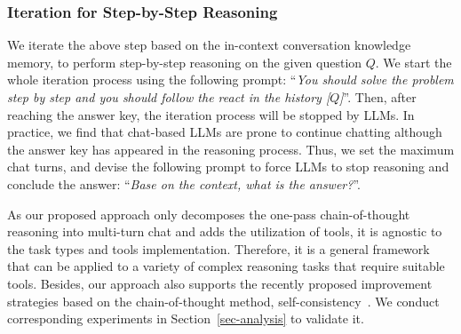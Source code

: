 \subsubsection{Iteration for Step-by-Step Reasoning}
We iterate the above step based on the in-context conversation knowledge memory, to perform step-by-step reasoning on the given question $Q$.
We start the whole iteration process using the following prompt:
``\emph{You should solve the problem step by step and you should follow the react in the history [$Q$]}''.
Then, after reaching the answer key, the iteration process will be stopped by LLMs.
In practice, we find that chat-based LLMs are prone to continue chatting although the answer key has appeared in the reasoning process.
Thus, we set the maximum chat turns, and devise the following prompt to force LLMs to stop reasoning and conclude the answer:
``\emph{Base on the context, what is the answer?}''.

As our proposed approach only decomposes the one-pass chain-of-thought reasoning into multi-turn chat and adds the utilization of tools, it is agnostic to the task types and tools implementation.
Therefore, it is a general framework that can be applied to a variety of complex reasoning tasks that require suitable tools.
Besides, our approach also supports the recently proposed improvement strategies based on the chain-of-thought method, \eg self-consistency~\cite{self-consistency}.
We conduct corresponding experiments in Section~\ref{sec-analysis} to validate it.

